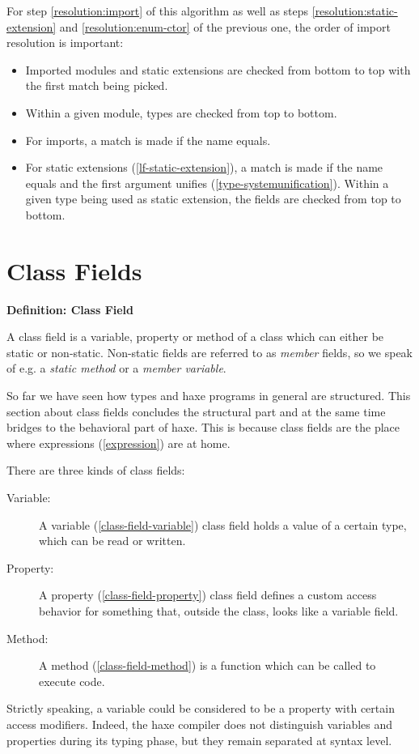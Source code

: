 \documentclass[a4paper,oneside]{book}
\newenvironment{myshaded}
  {\def\FrameCommand{\fboxsep=\topsep\colorbox{bgcolor}}%
  \MakeFramed {\advance\hsize-\width \FrameRestore}}%
 {\endMakeFramed}
\newcommand{\define}[3][Definition]
	{\begin{myshaded}\noindent\textbf{#1: #2}\par\nobreak\noindent\ignorespaces#3\label{def:#2}\end{myshaded}}
\newcommand{\tref}[2]{#1 (\ref{#2})}
\begin{document}
For step \ref{resolution:import} of this algorithm as well as steps \ref{resolution:static-extension} and \ref{resolution:enum-ctor} of the previous one, the order of import resolution is important:

\begin{itemize}
	\item Imported modules and static extensions are checked from bottom to top with the first match being picked.
	\item Within a given module, types are checked from top to bottom.
	\item For imports, a match is made if the name equals.
	\item For \tref{static extensions}{lf-static-extension}, a match is made if the name equals and the first argument \tref{unifies}{type-systemunification}. Within a given type being used as static extension, the fields are checked from top to bottom.
\end{itemize}




\chapter{Class Fields}
\label{class-field}

\define{Class Field}{A class field is a variable, property or method of a class which can either be static or non-static. Non-static fields are referred to as \emph{member} fields, so we speak of e.g. a \emph{static method} or a \emph{member variable}.}

So far we have seen how types and haxe programs in general are structured. This section about class fields concludes the structural part and at the same time bridges to the behavioral part of haxe. This is because class fields are the place where \tref{expressions}{expression} are at home.

There are three kinds of class fields:

\begin{description}
	\item[Variable:] A \tref{variable}{class-field-variable} class field holds a value of a certain type, which can be read or written.
	\item[Property:] A \tref{property}{class-field-property} class field defines a custom access behavior for something that, outside the class, looks like a variable field.
	\item[Method:] A \tref{method}{class-field-method} is a function which can be called to execute code.
\end{description}
Strictly speaking, a variable could be considered to be a property with certain access modifiers. Indeed, the haxe compiler does not distinguish variables and properties during its typing phase, but they remain separated at syntax level.
\end{document}
